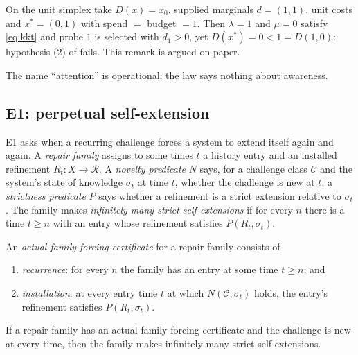 \begin{remark}\label{rem:e6-unlinked}
On the unit simplex take $D(x) = x_0$, supplied marginals $d = (1, 1)$, unit costs and
$x^* = (0, 1)$ with spend $=$ budget $= 1$. Then $\lambda = 1$ and $\mu = 0$ satisfy \eqref{eq:kkt}
and probe $1$ is selected with $d_1 > 0$, yet $D(x^*) = 0 < 1 = D(1, 0)$: hypothesis (2) of
 fails. This remark is argued on paper.
\end{remark}

The name ``attention'' is operational; the law says nothing about awareness.

\subsection{E1: perpetual self-extension}\label{sec:e1-forcing}

E1 asks when a recurring challenge forces a system to extend itself again and again. A \emph{repair
family} assigns to some times $t$ a history entry and an installed refinement $R_t : X \to
\mathcal R$. A \emph{novelty predicate} $N$ says, for a challenge class $\mathcal C$ and the
system's state of knowledge $\sigma_t$ at time $t$, whether the challenge is new at $t$; a
\emph{strictness predicate} $P$ says whether a refinement is a strict extension relative to
$\sigma_t$. The family makes \emph{infinitely many strict self-extensions} if for every $n$ there is
a time $t \ge n$ with an entry whose refinement satisfies $P(R_t, \sigma_t)$.

\begin{definition}\label{def:e1-forcing}
An \emph{actual-family forcing certificate} for a repair family consists of
\begin{enumerate}
  \item \emph{recurrence}: for every $n$ the family has an entry at some time $t \ge n$; and
  \item \emph{installation}: at every entry time $t$ at which $N(\mathcal C, \sigma_t)$ holds, the
    entry's refinement satisfies $P(R_t, \sigma_t)$.
\end{enumerate}
\end{definition}

\begin{proposition}\label{prop:e1-forcing}
If a repair family has an actual-family forcing certificate and the challenge is new at every time,
then the family makes infinitely many strict self-extensions.
\end{proposition}

